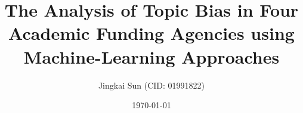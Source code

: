 \documentclass[hidelinks, a4paper,11pt]{article}
\title{The Analysis of Topic Bias in Four Academic Funding Agencies using Machine-Learning Approaches}
\author{Jingkai Sun (CID: 01991822)}
\date{\today}
\begin{document}


\newpage


\newpage


\newpage
\tableofcontents

\newpage
\listoffigures

\linenumbers

\newpage


\maketitle







\newpage


\end{document}

